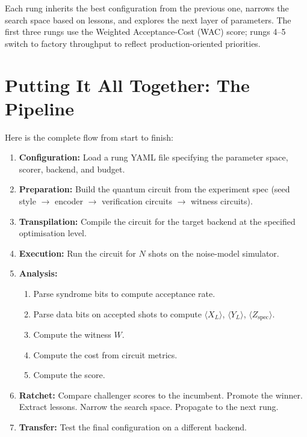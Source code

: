 \documentclass[11pt,a4paper,twoside]{report}
\theoremstyle{definition}
\newcommand{\expect}[1]{\langle #1 \rangle}
\begin{document}
Each rung inherits the best configuration from the previous one,
narrows the search space based on lessons, and explores the next layer
of parameters. The first three rungs use the Weighted Acceptance-Cost
(WAC) score; rungs 4--5 switch to factory throughput to reflect
production-oriented priorities.

\chapter{Putting It All Together: The Pipeline}
\label{ch:pipeline}

Here is the complete flow from start to finish:

\begin{enumerate}
  \item \textbf{Configuration:} Load a rung YAML file specifying the
        parameter space, scorer, backend, and budget.
  \item \textbf{Preparation:} Build the quantum circuit from the
        experiment spec (seed style $\to$ encoder $\to$ verification
        circuits $\to$ witness circuits).
  \item \textbf{Transpilation:} Compile the circuit for the target
        backend at the specified optimisation level.
  \item \textbf{Execution:} Run the circuit for $N$ shots on the
        noise-model simulator.
  \item \textbf{Analysis:}
    \begin{enumerate}[nosep]
      \item Parse syndrome bits to compute acceptance rate.
      \item Parse data bits on accepted shots to compute
            $\expect{X_L}$, $\expect{Y_L}$, $\expect{Z_{\text{spec}}}$.
      \item Compute the witness $W$.
      \item Compute the cost from circuit metrics.
      \item Compute the score.
    \end{enumerate}
  \item \textbf{Ratchet:} Compare challenger scores to the incumbent.
        Promote the winner. Extract lessons. Narrow the search space.
        Propagate to the next rung.
  \item \textbf{Transfer:} Test the final configuration on a different
        backend.
\end{enumerate}
\end{document}
